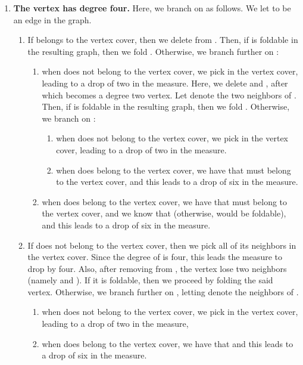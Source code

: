 \documentclass[svgnames]{llncs}
\begin{document}
{\begin{enumerate}[series=main,label=\bfseries Case~\arabic*:] \item {\bf The vertex  has degree four.} Here, we branch on  as follows. We let  to be an edge in the graph.

\begin{enumerate}
\item If  belongs to the vertex cover, then we delete  from . Then, if  is foldable in the resulting graph, then we fold . Otherwise, we branch further on :
\begin{enumerate}
\item when  does not belong to the vertex cover, we pick  in the vertex cover, leading to a drop of two in the measure. Here, we delete  and , after which  becomes a degree two vertex. Let  denote the two neighbors of . Then, if  is foldable in the resulting graph, then we fold . Otherwise, we branch on :
\begin{enumerate}
\item when  does not belong to the vertex cover, we pick  in the vertex cover, leading to a drop of two in the measure.
\item when  does belong to the vertex cover, we have that  must belong to the vertex cover, and this leads to a drop of six in the measure.
\end{enumerate}
\item when  does belong to the vertex cover, we have that  must belong to the vertex cover, and we know that  (otherwise,  would be foldable), and this leads to a drop of six in the measure.
\end{enumerate}
\item If  does not belong to the vertex cover, then we pick all of its neighbors in the vertex cover. Since the degree of  is four, this leads the measure to drop by four. 
Also, after removing  from , the vertex  lose two neighbors (namely  and ). If it is foldable, then we proceed by folding the said vertex. 
Otherwise, we branch further on , letting  denote the neighbors of .
\begin{enumerate}  
\item when  does not belong to the vertex cover, we pick  in the vertex cover, leading to a drop of two in the measure,
\item when  does belong to the vertex cover, we have that  and this leads to a drop of six in the measure. 
\end{enumerate}
\end{enumerate}



\end{enumerate}}
\end{document}
